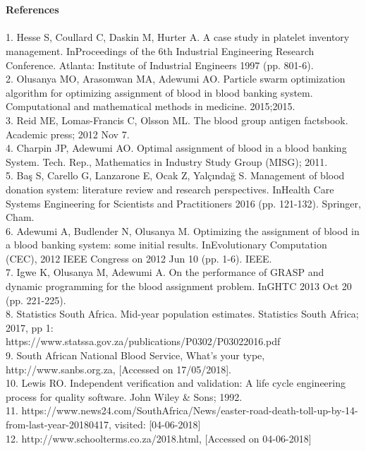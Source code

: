 \documentclass{article}
\begin{document}
\\
\\
\textbf{References}\\
\\
1.	Hesse S, Coullard C, Daskin M, Hurter A. A case study in platelet inventory management. InProceedings of the 6th Industrial Engineering Research Conference. Atlanta: Institute of Industrial Engineers 1997 (pp. 801-6).\\
2.	Olusanya MO, Arasomwan MA, Adewumi AO. Particle swarm optimization algorithm for optimizing assignment of blood in blood banking system. Computational and mathematical methods in medicine. 2015;2015.\\
3.	Reid ME, Lomas-Francis C, Olsson ML. The blood group antigen factsbook. Academic press; 2012 Nov 7.\\
4.	Charpin JP, Adewumi AO. Optimal assignment of blood in a blood banking System. Tech. Rep., Mathematics in Industry Study Group (MISG); 2011. \\
5.	Baş S, Carello G, Lanzarone E, Ocak Z, Yalçındağ S. Management of blood donation system: literature review and research perspectives. InHealth Care Systems Engineering for Scientists and Practitioners 2016 (pp. 121-132). Springer, Cham.\\
6.	Adewumi A, Budlender N, Olusanya M. Optimizing the assignment of blood in a blood banking system: some initial results. InEvolutionary Computation (CEC), 2012 IEEE Congress on 2012 Jun 10 (pp. 1-6). IEEE.\\
7.	Igwe K, Olusanya M, Adewumi A. On the performance of GRASP and dynamic programming for the blood assignment problem. InGHTC 2013 Oct 20 (pp. 221-225).\\
8.	Statistics South Africa. Mid-year population estimates. Statistics South Africa; 2017, pp 1:\\ https://www.statssa.gov.za/publications/P0302/P03022016.pdf \\
9.	South African National Blood Service, What’s your type, http://www.sanbs.org.za, [Accessed on 17/05/2018].\\
10.	Lewis RO. Independent verification and validation: A life cycle engineering process for quality software. John Wiley & Sons; 1992.\\
11.	https://www.news24.com/SouthAfrica/News/easter-road-death-toll-up-by-14-from-last-year-20180417, visited: [04-06-2018]\\
12.	http://www.schoolterms.co.za/2018.html, [Accessed on 04-06-2018]\\
\end{document}
